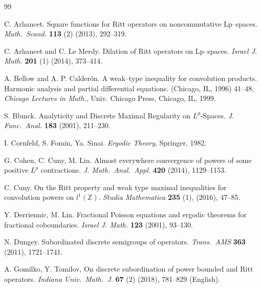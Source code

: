 \documentclass[11pt]{amsart}
\theoremstyle{definition}
\theoremstyle{remark}
\begin{document}

\begin{thebibliography}{99}

 C. Arhancet.  Square functions for Ritt operators on noncommutative Lp--spaces. \textit{Math.\
Scand.} {\bf 113} (2) (2013), 292--319.

 C. Arhancet and C. Le Merdy. Dilation of Ritt operators on Lp--spaces. \textit{Israel J.
Math.} {\bf 201} (1)  (2014),  373--414.

 A. Bellow and A. P. Calder\'on. A weak--type inequality for convolution products. Harmonic analysis
and partial differential equations. (Chicago, IL, 1996) 41--48, \textit{Chicago Lectures in Math.}, Univ.
Chicago Press, Chicago, IL, 1999.



 S. Blunck. Analyticity and Discrete Maximal Regularity on $L^p$-Spaces. \textit{J. Func.\ Anal.} {\bf 183} (2001), 211--230.

 I. Cornfeld, S. Fomin, Ya. Sinai. \textit{ Ergodic Theory}, Springer, 1982.

G. Cohen, C. Cuny, M. Lin. Almost everywhere convergence of powers of some positive $L^p$ contractions. \textit{J. Math.\ Anal.\ Appl.} {\bf 420} (2014), 1129--1153.

 C. Cuny. On the Ritt property and weak type maximal inequalities for convolution powers on $l^1(\mathbb Z)$. \textit{Studia Mathematica} {\bf 235} (1), (2016), 47--85.

 Y. Derriennic, M. Lin. Fractional Poisson equations and ergodic theorems for
fractional coboundaries. \textit{Israel J. Math.} {\bf 123} (2001), 93--130.

 N. Dungey. Subordinated discrete semigroups of operators. \textit{Trans.\ AMS} {\bf 363} (2011), 1721--1741.

A. Gomilko, Y. Tomilov, On discrete subordination of power bounded and Ritt operators. \textit{Indiana Univ.\ Math.\ J.} {\bf 67} (2)  (2018),  781--829 (English).


\end{thebibliography}
\end{document}
